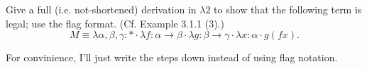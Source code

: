 \begin{problem}{3.2}
    Give a full (i.e. not-shortened) derivation in $\lambda 2$ to show that the following term is legal; use the flag format. (Cf. Example 3.1.1 (3).)
    $$M\equiv\lambda\alpha,\beta,\gamma:* \cdot \lambda f:\alpha\rightarrow\beta \cdot \lambda g:\beta\rightarrow\gamma \cdot \lambda x:\alpha \cdot g(f x).$$
\end{problem}

\begin{solution}
    For convinience, I'll just write the steps down instead of using flag notation. \\
    \begin{prooftree}
    \end{prooftree}

\end{solution}